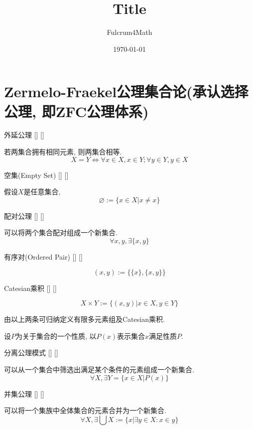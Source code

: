 \documentclass[UTF8]{ctexart}
\title{Title}
\author{Fulcrum4Math}
\date{\today}
\begin{document}
\section{Zermelo-Fraekel公理集合论(承认选择公理, 即ZFC公理体系)}

    \begin{axm}
        []
        {外延公理}
        []
        []


        若两集合拥有相同元素, 则两集合相等. 
        \[X=Y\Longleftrightarrow\forall x\in X, x\in Y; \forall y\in Y, y\in X\]
    \end{axm}
    
    \begin{dfn}
        []
        {空集(Empty Set)}
        []
        []


        假设$X$是任意集合, 
        \[\varnothing:=\{x\in X|x\neq x\}\]
    \end{dfn}
    
    \begin{axm}
        []
        {配对公理}
        []
        []


        可以将两个集合配对组成一个新集合. 
        \[\forall x,y, \exists\{x,y\}\]
    \end{axm}
    
    \begin{dfn}
        []
        {有序对(Ordered Pair)}
        []
        []

        \[(x,y):=\{\{x\},\{x,y\}\}\]
    \end{dfn}
    
    \begin{dfn}
        []
        {Catesian乘积}
        []
        []

        \[X\times Y:=\{(x,y)|x\in X, y\in Y\}\]
    \end{dfn}

    由以上两条可归纳定义有限多元素组及Catesian乘积. 

    \begin{dfn}
        设$P$为关于集合的一个性质, 以$P(x)$表示集合$x$满足性质$P$. 
    \end{dfn}
    
    \begin{axm}
        []
        {分离公理模式}
        []
        []


        可以从一个集合中筛选出满足某个条件的元素组成一个新集合. 
        \[\forall X, \exists Y=\{x\in X|P(x)\}\]
    \end{axm}
    
    \begin{axm}
        []
        {并集公理}
        []
        []


        可以将一个集族中全体集合的元素合并为一个新集合. 
        \[\forall X, \exists\bigcup X:=\{x|\exists y\in X: x\in y\}\]
    \end{axm}
    
\end{document}
